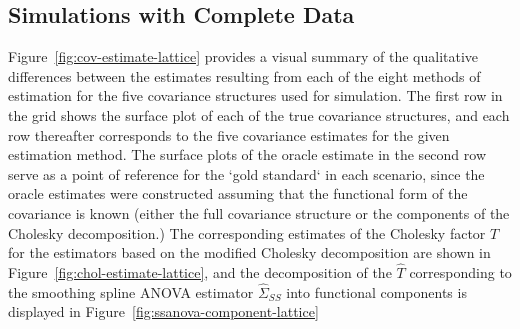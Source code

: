 \subsection{Simulations with Complete Data}
Figure~\ref{fig:cov-estimate-lattice} provides a visual summary of the qualitative differences between the estimates resulting from each of the eight methods of estimation for the five covariance structures used for simulation. The first row in the grid shows the surface plot of each of the true covariance structures, and each row thereafter corresponds to the five covariance estimates for the given estimation method. The surface plots of the oracle estimate in the second row serve as a point of reference for the `gold standard` in each scenario, since the oracle estimates were constructed assuming that the functional form of the covariance is known (either the full covariance structure or the components of the Cholesky decomposition.) The corresponding estimates of the Cholesky factor $T$ for the estimators based on the modified Cholesky decomposition are shown in Figure~\ref{fig:chol-estimate-lattice}, and the decomposition of the $\hat{T}$ corresponding to the smoothing spline ANOVA estimator $\hat{\Sigma}_{SS}$ into functional components is displayed in Figure~\ref{fig:ssanova-component-lattice}

%

